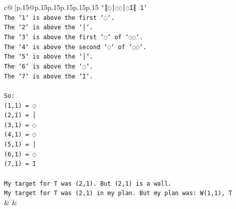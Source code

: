 \documentclass{article}
\begin{document}
{\begin{supertabular}{c@{$\;$}|p{.15\linewidth}@{}p{.15\linewidth}p{.15\linewidth}p{.15\linewidth}p{.15\linewidth}p{.15\linewidth}}
{{{\texttt{`║◌│◌◌│◌I║ 1`} \\
\texttt{The `1` is above the first `◌`.} \\
\texttt{The `2` is above the `│`.} \\
\texttt{The `3` is above the first `◌` of `◌◌`.} \\
\texttt{The `4` is above the second `◌` of `◌◌`.} \\
\texttt{The `5` is above the `│`.} \\
\texttt{The `6` is above the `◌`.} \\
\texttt{The `7` is above the `I`.} \\
\\ 
\texttt{So:} \\
\texttt{(1,1) = ◌} \\
\texttt{(2,1) = │} \\
\texttt{(3,1) = ◌} \\
\texttt{(4,1) = ◌} \\
\texttt{(5,1) = │} \\
\texttt{(6,1) = ◌} \\
\texttt{(7,1) = I} \\
\\ 
\texttt{My target for T was (2,1). But (2,1) is a wall.} \\
\texttt{My target for T was (2,1) in my plan. But my plan was: W(1,1), T} \\
            }
        }
    }
    & & \\ \\


\end{supertabular}}
\end{document}
